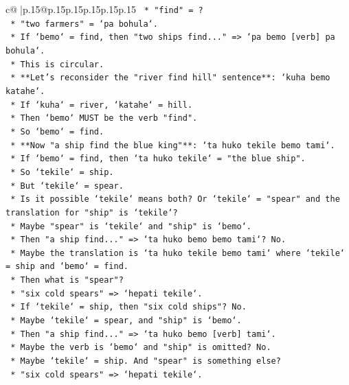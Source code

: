 \documentclass{article}
\begin{document}
{\begin{supertabular}{c@{$\;$}|p{.15\linewidth}@{}p{.15\linewidth}p{.15\linewidth}p{.15\linewidth}p{.15\linewidth}p{.15\linewidth}}
{{{\texttt{        *   "find" = ?} \\
\texttt{        *   "two farmers" = `pa bohula`.} \\
\texttt{        *   If `bemo` = find, then "two ships find..." => `pa bemo {[}verb{]} pa bohula`.} \\
\texttt{        *   This is circular.} \\
\texttt{    *   **Let's reconsider the "river find hill" sentence**: `kuha bemo katahe`.} \\
\texttt{        *   If `kuha` = river, `katahe` = hill.} \\
\texttt{        *   Then `bemo` MUST be the verb "find".} \\
\texttt{        *   So `bemo` = find.} \\
\texttt{    *   **Now "a ship find the blue king"**: `ta huko tekile bemo tami`.} \\
\texttt{        *   If `bemo` = find, then `ta huko tekile` = "the blue ship".} \\
\texttt{        *   So `tekile` = ship.} \\
\texttt{        *   But `tekile` = spear.} \\
\texttt{        *   Is it possible `tekile` means both? Or `tekile` = "spear" and the translation for "ship" is `tekile`?} \\
\texttt{        *   Maybe "spear" is `tekile` and "ship" is `bemo`.} \\
\texttt{        *   Then "a ship find..." => `ta huko bemo bemo tami`? No.} \\
\texttt{        *   Maybe the translation is `ta huko tekile bemo tami` where `tekile` = ship and `bemo` = find.} \\
\texttt{        *   Then what is "spear"?} \\
\texttt{        *   "six cold spears" => `hepati tekile`.} \\
\texttt{        *   If `tekile` = ship, then "six cold ships"? No.} \\
\texttt{        *   Maybe `tekile` = spear, and "ship" is `bemo`.} \\
\texttt{        *   Then "a ship find..." => `ta huko bemo {[}verb{]} tami`.} \\
\texttt{        *   Maybe the verb is `bemo` and "ship" is omitted? No.} \\
\texttt{        *   Maybe `tekile` = ship. And "spear" is something else?} \\
\texttt{        *   "six cold spears" => `hepati tekile`.} \\
}}}
\end{supertabular}}
\end{document}

